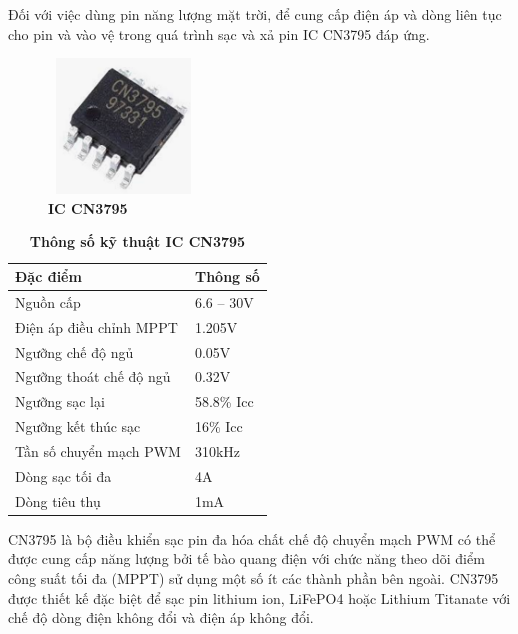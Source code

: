 \documentclass{article} %
\begin{document}
\begin{itemize}
		Đối với việc dùng pin  năng lượng mặt trời, để cung cấp điện áp và dòng liên tục cho pin và vào vệ trong quá trình sạc và xả pin IC CN3795 đáp ứng.
		\begin{figure}[!ht]
			\centering
			\includegraphics[width=4cm,height=3.6cm]{Images/CN3795.png}
			\caption[IC CN3795\cite{ICCN3795}]{\bfseries \fontsize{12pt}{0pt}\selectfont IC CN3795\cite{ICCN3795}}
			\label{CN3795}
		\end{figure}
		\begin{table}[H]
			\centering
			\begin{tabular}{|l|l|}
				\hline
				Đặc điểm                & Thông số   \\ \hline
				Nguồn cấp               & 6.6 – 30V  \\ \hline
				Điện áp điều chỉnh MPPT & 1.205V     \\ \hline
				Ngưỡng chế độ ngủ       & 0.05V      \\ \hline
				Ngưỡng thoát chế độ ngủ & 0.32V      \\ \hline
				Ngưỡng sạc lại          & 58.8\% Icc \\ \hline
				Ngưỡng kết thúc sạc     & 16\% Icc   \\ \hline
				Tần số chuyển mạch PWM  & 310kHz     \\ \hline
				Dòng sạc tối đa         & 4A         \\ \hline
				Dòng tiêu thụ           & 1mA        \\ \hline
			\end{tabular}
			\caption[Thông số kỹ thuật IC CN3795\cite{ICCN3795} ]{\bfseries\fontsize{12pt}{0pt}\selectfont Thông số kỹ thuật IC CN3795\cite{ICCN3795}}
			\label{ICCN3795}
		\end{table}
		
		CN3795 là bộ điều khiển sạc pin đa hóa chất chế độ chuyển mạch PWM có thể được cung cấp năng lượng bởi tế bào quang điện với chức năng theo dõi điểm công suất tối đa (MPPT) sử dụng một số ít các thành phần bên ngoài. CN3795 được thiết kế đặc biệt để sạc pin lithium ion, LiFePO4 hoặc Lithium Titanate với chế độ dòng điện không đổi và điện áp không đổi.
		

\end{itemize}
\end{document}
